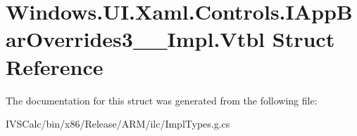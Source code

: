 \hypertarget{struct_windows_1_1_u_i_1_1_xaml_1_1_controls_1_1_i_app_bar_overrides3_____impl_1_1_vtbl}{}\section{Windows.\+U\+I.\+Xaml.\+Controls.\+I\+App\+Bar\+Overrides3\+\_\+\+\_\+\+Impl.\+Vtbl Struct Reference}
\label{struct_windows_1_1_u_i_1_1_xaml_1_1_controls_1_1_i_app_bar_overrides3_____impl_1_1_vtbl}


The documentation for this struct was generated from the following file\+:\begin{DoxyCompactItemize}
\item 
I\+V\+S\+Calc/bin/x86/\+Release/\+A\+R\+M/ilc/Impl\+Types.\+g.\+cs\end{DoxyCompactItemize}
